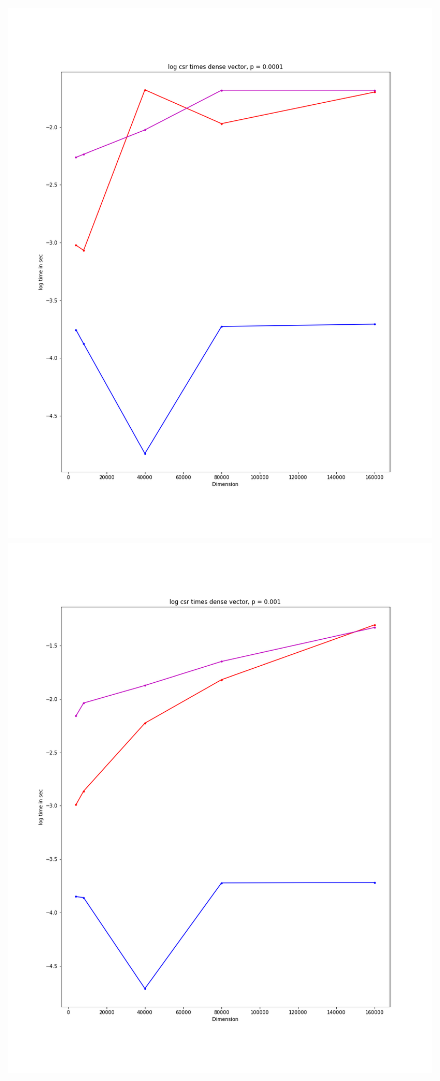\documentclass[12pt]{article}
\begin{document}
\begin{figure}[h]
  \includegraphics[scale = 0.16]{log_csr_dv_0001.png}
  \includegraphics[scale = 0.16]{log_csr_dv_001.png}

\end{figure}
\end{document}
